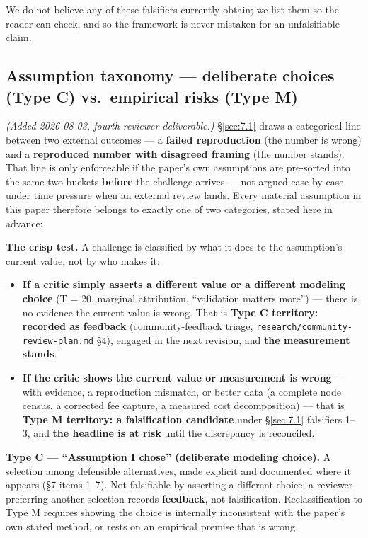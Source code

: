 \documentclass[11pt]{article}
\begin{document}
We do not believe any of these falsifiers currently obtain; we list them so the
reader can check, and so the framework is never mistaken for an unfalsifiable
claim.

\subsection{Assumption taxonomy --- deliberate choices (Type C) vs.\ empirical risks (Type M)}\label{sec:7.2}
\textit{(Added 2026-08-03, fourth-reviewer deliverable.)}
\S\ref{sec:7.1} draws a categorical line between two external outcomes --- a
\textbf{failed reproduction} (the number is wrong) and a \textbf{reproduced
number with disagreed framing} (the number stands). That line is only
enforceable if the paper's own assumptions are pre-sorted into the same two
buckets \textbf{before} the challenge arrives --- not argued case-by-case under
time pressure when an external review lands. Every material assumption in this
paper therefore belongs to exactly one of two categories, stated here in advance:

\textbf{The crisp test.} A challenge is classified by what it does to the
assumption's current value, not by who makes it:
\begin{itemize}[nosep]
  \item \textbf{If a critic simply asserts a different value or a different
  modeling choice} (T = 20, marginal attribution, ``validation matters more'')
  --- there is no evidence the current value is wrong. That is \textbf{Type C
  territory: recorded as feedback} (community-feedback triage,
  \texttt{research/community-review-plan.md} \S4), engaged in the next revision,
  and \textbf{the measurement stands}.
  \item \textbf{If the critic shows the current value or measurement is wrong}
  --- with evidence, a reproduction mismatch, or better data (a complete node
  census, a corrected fee capture, a measured cost decomposition) --- that is
  \textbf{Type M territory: a falsification candidate} under \S\ref{sec:7.1}
  falsifiers 1--3, and \textbf{the headline is at risk} until the discrepancy is
  reconciled.
\end{itemize}

\textbf{Type C --- ``Assumption I chose'' (deliberate modeling choice).} A
selection among defensible alternatives, made explicit and documented where it
appears (\S7 items 1--7). Not falsifiable by asserting a different choice; a
reviewer preferring another selection records \textbf{feedback}, not
falsification. Reclassification to Type M requires showing the choice is
internally inconsistent with the paper's own stated method, or rests on an
empirical premise that is wrong.
\end{document}
